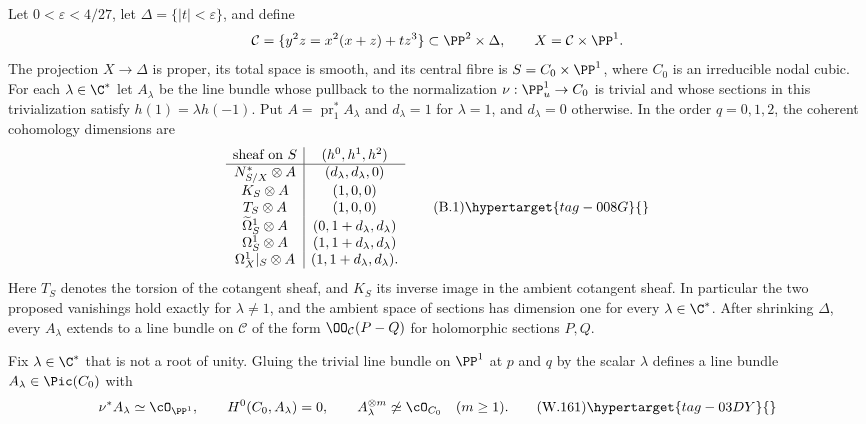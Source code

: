 \begin{proposition}\hypertarget{tag-01BK}{}\label{cdp:st:B1}

\label{wbII:thm:nodal-test}\label{wbII:prop:family-geometry}\label{wbII:prop:nodal-counterexample}
Let $0<\varepsilon<4/27$, let $\Delta=\{|t|<\varepsilon\}$, and define
\[
 \mathcal C=\{y^2z=x^2(x+z)+tz^3\}\subset\PP^2\times\Delta,
 \qquad X=\mathcal C\times\PP^1.
\]
The projection $X\to\Delta$ is proper, its total space is smooth, and its central fibre is $S=C_0\times\PP^1$, where $C_0$ is an irreducible nodal cubic. For each $\lambda\in\C^*$ let $A_\lambda$ be the line bundle whose pullback to the normalization $\nu:\PP^1_u\to C_0$ is trivial and whose sections in this trivialization satisfy $h(1)=\lambda h(-1)$. Put $A=\operatorname{pr}_1^*A_\lambda$ and $d_\lambda=1$ for $\lambda=1$, and $d_\lambda=0$ otherwise. In the order $q=0,1,2$, the coherent cohomology dimensions are
\[
\begin{array}{c|c}
\text{sheaf on }S & (h^0,h^1,h^2)\\\hline
 N^*_{S/X}\otimes A &(d_\lambda,d_\lambda,0)\\
 K_S\otimes A &(1,0,0)\\
 T_S\otimes A &(1,0,0)\\
 \widetilde\Omega^1_S\otimes A &(0,1+d_\lambda,d_\lambda)\\
 \Omega^1_S\otimes A &(1,1+d_\lambda,d_\lambda)\\
 \Omega^1_X|_S\otimes A &(1,1+d_\lambda,d_\lambda).
\end{array}                                                    \tag{B.1}\hypertarget{tag-008G}{}\label{cdp:eq:B.1}
\]
Here $T_S$ denotes the torsion of the cotangent sheaf, and $K_S$ its inverse image in the ambient cotangent sheaf. In particular the two proposed vanishings hold exactly for $\lambda\ne1$, and the ambient space of sections has dimension one for every $\lambda\in\C^*$. After shrinking $\Delta$, every $A_\lambda$ extends to a line bundle on $\mathcal C$ of the form $\OO_{\mathcal C}(P-Q)$ for holomorphic sections $P,Q$.
\end{proposition}

\begin{lemma}
\hypertarget{tag-03IB}{}\label{wbII:lem:gluing-bundle}


Fix $\lambda\in\C^*$ that is not a root of unity.  Gluing the trivial line
bundle on $\PP^1$ at $p$ and $q$ by the scalar $\lambda$ defines a line bundle
\(A_\lambda\in\Pic(C_0)\) with
\[
 \nu^*A_\lambda\simeq\cO_{\PP^1},\qquad
 H^0(C_0,A_\lambda)=0,\qquad
 A_\lambda^{\otimes m}\not\simeq\cO_{C_0}\quad(m\ge1).
 \tag{W.161}\hypertarget{tag-03DY}{}\label{wbII:eq:CN:4.4}
\]
\end{lemma}

